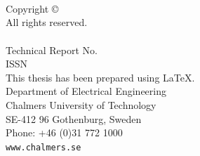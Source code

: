 \documentclass[
  paper=16.9cm:23.9cm,
  pagesize,
  twoside,
  10pt,
  chapterprefix,
  headsepline=on,
  footinclude=off,
  DIV=18,
  BCOR=7mm,
  bibliography=totoc,
  numbers=noenddot,
  open=right,
]{scrreprt}
\begin{document}
\newpage

\thispagestyle{empty}

\textbf{\ISSNPageTitle}\\\\
{\textsc{\ISSNPageName}}
\vspace{4.0 cm}\\
Copyright \copyright~\TheYear~\textsc{\ISSNPageName}\\ All rights reserved.\\
\vspace{1.5 cm}\\
Technical Report No.~\TheReportNo \\
ISSN \TheISSN\\
\vspace{1 cm}%
This thesis has been prepared using \LaTeX.\\
Department of Electrical Engineering \\
Chalmers University of Technology \\
SE-412 96 Gothenburg, Sweden \\
Phone: +46 (0)31 772 1000 \\
\texttt{www.chalmers.se} \\
\vfill
{}

\newpage



\thispagestyle{empty}
\centerline{ }
\vspace{1cm}

\centerline{{\small \emph{\TheDedication}}}

\thispagestyle{empty}

\EmptyPage %


\hypersetup{pageanchor=true}

\setcounter{page}{1}

\setlength{\parindent}{1em}
\end{document}
